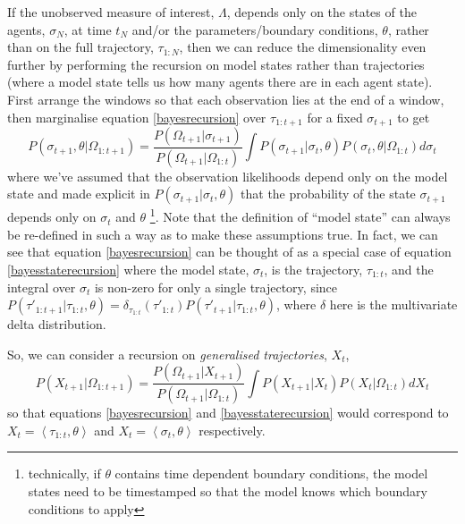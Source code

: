 \documentclass{article}
\begin{document}
If the unobserved measure of interest, $\Lambda$, depends only on the states of the agents, $\sigma_N$, at time $t_N$ and/or the parameters/boundary conditions, $\theta$, rather than on the full trajectory, $\tau_{1:N}$, then we can reduce the dimensionality even further by performing the recursion on model states rather than trajectories (where a model state tells us how many agents there are in each agent state). First arrange the windows so that each observation lies at the end of a window, then marginalise equation \eqref{bayesrecursion} over $\tau_{1:t+1}$ for a fixed $\sigma_{t+1}$ to get
\begin{equation}
P\left(\sigma_{t+1}, \theta | \Omega_{1:t+1}\right)
=
\frac{ P(\Omega_{t+1}|\sigma_{t+1}) 
}
{	P(\Omega_{t+1}| \Omega_{1:t}) }
\int P(\sigma_{t+1}|\sigma_t,\theta)P\left(\sigma_{t},\theta| \Omega_{1:t}\right) d \sigma_t
\label{bayesstaterecursion}
\end{equation}
where we've assumed that the observation likelihoods depend only on the model state and made explicit in $P(\sigma_{t+1}|\sigma_t,\theta)$ that the probability of the state $\sigma_{t+1}$ depends only on $\sigma_t$ and $\theta$  \footnote{technically, if $\theta$ contains time dependent boundary conditions, the model states need to be timestamped so that the model knows which boundary conditions to apply}.   Note that the definition of ``model state'' can always be re-defined in such a way as to make these assumptions true. In fact, we can see that equation \eqref{bayesrecursion} can be thought of as a special case of equation \eqref{bayesstaterecursion} where the model state, $\sigma_t$, is the trajectory, $\tau_{1:t}$, and the integral over $\sigma_t$ is non-zero for only a single trajectory, since $P(\tau'_{1:t+1}|\tau_{1:t},\theta) = \delta_{\tau_{1:t}}(\tau'_{1:t})P(\tau'_{t+1}|\tau_{1:t},\theta)$, where $\delta$ here is the multivariate delta distribution.

So, we can consider a recursion on \textit{generalised trajectories}, $X_t$,
\begin{equation}
P\left(X_{t+1}| \Omega_{1:t+1}\right)
=
\frac{ P(\Omega_{t+1}|X_{t+1})}
{	P(\Omega_{t+1}| \Omega_{1:t}) }
\int P(X_{t+1}|X_t)P\left(X_{t}| \Omega_{1:t}\right) d X_t
\label{generalisedbayesrecursion}
\end{equation}
so that equations \eqref{bayesrecursion} and \eqref{bayesstaterecursion} would correspond to $X_t=\left<\tau_{1:t},\theta\right>$ and $X_t=\left<\sigma_t,\theta\right>$ respectively.
\end{document}
